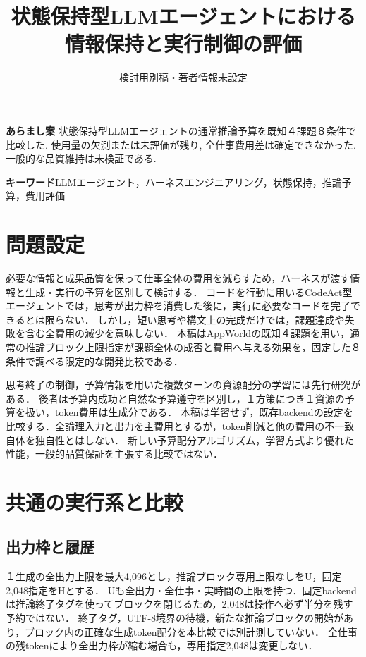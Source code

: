\documentclass[uplatex,a4paper,twocolumn,10pt]{jsarticle}
\title{状態保持型LLMエージェントにおける\newline 情報保持と実行制御の評価}
\author{検討用別稿・著者情報未設定}
\date{}
\begin{document}
\raggedbottom
\maketitle
\noindent\textbf{あらまし案}\quad
状態保持型LLMエージェントの通常推論予算を既知４課題８条件で比較した. 使用量の欠測または未評価が残り, 全仕事費用差は確定できなかった. 一般的な品質維持は未検証である.

\noindent\textbf{キーワード}\quad LLMエージェント，ハーネスエンジニアリング，状態保持，推論予算，費用評価

\section{問題設定}
必要な情報と成果品質を保って仕事全体の費用を減らすため，ハーネスが渡す情報と生成・実行の予算を区別して検討する．
コードを行動に用いるCodeAct\cite{codeact}型エージェントでは，思考が出力枠を消費した後に，実行に必要なコードを完了できるとは限らない．
しかし，短い思考や構文上の完成だけでは，課題達成や失敗を含む全費用の減少を意味しない．
本稿はAppWorld\cite{appworld}の既知４課題を用い，通常の推論ブロック上限指定が課題全体の成否と費用へ与える効果を，固定した８条件で調べる限定的な開発比較である．

思考終了の制御\cite{s1}，予算情報を用いた複数ターンの資源配分の学習\cite{budgettraining}には先行研究がある．
後者は予算内成功と自然な予算遵守を区別し，１方策につき１資源の予算を扱い，token費用は生成分である．
本稿は学習せず，既存backendの設定\cite{backend}を比較する．全論理入力と出力を主費用とするが，token削減と他の費用の不一致\cite{costproxy}自体を独自性とはしない．
新しい予算配分アルゴリズム，学習方式より優れた性能，一般的品質保証を主張する比較ではない．

\section{共通の実行系と比較}
\subsection{出力枠と履歴}
１生成の全出力上限を最大4,096とし，推論ブロック専用上限なしをU，固定2,048指定をHとする．
Uも全出力・全仕事・実時間の上限を持つ．固定backendは推論終了タグを使ってブロックを閉じるため，2,048は操作へ必ず半分を残す予約ではない．
終了タグ，UTF-8境界の待機，新たな推論ブロックの開始があり，ブロック内の正確な生成token配分を本比較では別計測していない．
全仕事の残tokenにより全出力枠が縮む場合も，専用指定2,048は変更しない．
\end{document}
